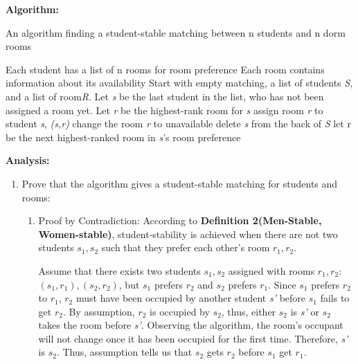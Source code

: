 \documentclass{homework}
\begin{document}
\begin{enumerate}
    \textbf{Algorithm: }
    \begin{algorithm}
    \caption{An algorithm finding a student-stable matching between n students and n dorm rooms}\label{alg:cap}
    \begin{algorithmic}
    \Require Each student has a list of n rooms for room preference
    \Ensure Each room contains information about its availability
    \State Start with empty matching, a list of students \textit{S}, and a list of room\textit{R}.
        \State Let \textit{s} be the last student in the list, who has not been assigned a room yet.
        \State Let \textit{r} be the highest-rank room for \textit{s}
                    \State assign room \textit{r} to student \textit{s}, \textit{(s,r)}
                    \State change the room \textit{r} to unavailable \State delete \textit{s} from the back of \textit{S}
                \Else
                    \State let r be the next highest-ranked room in \textit{s}'s room preference
                \EndIf
        \EndWhile
    \EndWhile
    \end{algorithmic}
    \end{algorithm}

\textbf{    Analysis:}
    \begin{enumerate}
        \item Prove that the algorithm gives a student-stable matching for students and rooms:

        \begin{enumerate}
            \item Proof by Contradiction:
            According to \textbf{Definition 2(Men-Stable, Women-stable)}, student-stability is achieved when there are not two students \textit{$s_1, s_2$} such that they prefer each other's room \textit{$r_1, r_2$}.
        
            Assume that there exists two students \textit{$s_1, s_2$} assigned with rooms \textit{$r_1, r_2$}: \textit{$(s_1, r_1), (s_2, r_2)$}, but \textit{$s_1$} prefers \textit{$r_2$} and \textit{$s_2$} prefers \textit{$r_1$}. Since \textit{$s_1$} prefers \textit{$r_2$} to \textit{$r_1$}, \textit{$r_2$} must have been occupied by another student \textit{s'} before \textit{$s_1$} fails to get \textit{$r_2$}. By assumption, \textit{$r_2$} is occupied by \textit{$s_2$}, thus, either \textit{$s_2$} is \textit{s'} or \textit{$s_2$} takes the room before \textit{s'}. Observing the algorithm, the room's occupant will not change once it has been occupied for the first time. Therefore, \textit{s'} is \textit{$s_2$}. Thus, assumption tells us that \textit{$s_2$} gets \textit{$r_2$} before \textit{$s_1$} get \textit{$r_1$}.
        

\end{enumerate}
\end{enumerate}
\end{enumerate}
\end{document}
